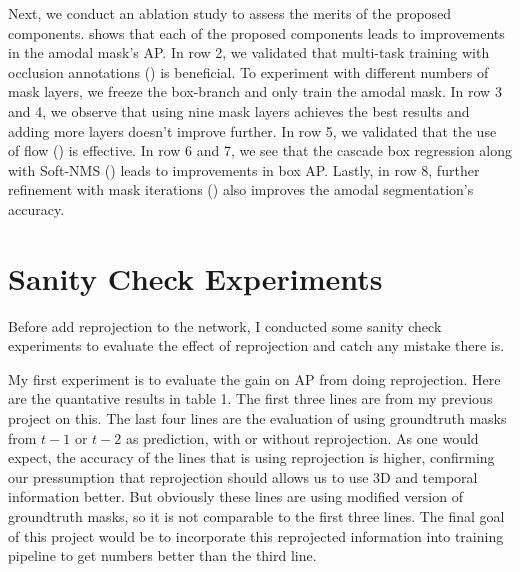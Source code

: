 Next, we conduct an ablation study to assess the merits of the proposed components.   shows that each of the proposed components leads to improvements in the amodal mask's AP.
In row 2, we validated that multi-task training with occlusion annotations () is beneficial. 
To experiment with different numbers of mask layers, we freeze the box-branch and only train the amodal mask.
In row 3 and 4, we observe that using nine mask layers achieves the best results and adding more layers doesn't improve further. In row 5, we validated that the use of flow () is effective. 
In row 6 and 7, we see that the cascade box regression along with Soft-NMS () leads to improvements in box AP. Lastly, in row 8, further refinement with mask iterations () also improves the amodal segmentation's accuracy.





\section{Sanity Check Experiments}
Before add reprojection to the network, I conducted some sanity check experiments to evaluate the effect of reprojection and catch any mistake there is. 

My first experiment is to evaluate the gain on AP from doing reprojection. Here are the quantative results in table 1. The first three lines are from my previous project on this. The last four lines are the evaluation of using groundtruth masks from $t-1$ or $t-2$ as prediction, with or without reprojection. As one would expect, the accuracy of the lines that is using reprojection is higher, confirming our pressumption that reprojection should allows us to use 3D and temporal information better. But obviously these lines are using modified version of groundtruth masks, so it is not comparable to the first three lines. The final goal of this project would be to incorporate this reprojected information into training pipeline to get numbers better than the third line.


